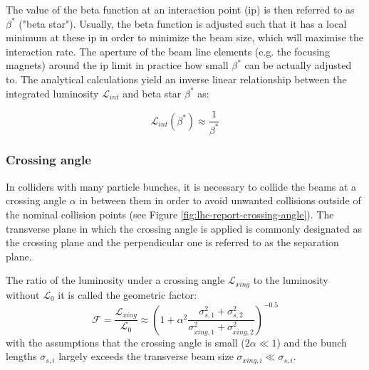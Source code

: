 \documentclass[encoding=utf8,british]{tumphthesis}
\begin{document}
The value of the beta function at an interaction point (\acrshort{ip}) is then referred to as $\beta^*$ ("beta star"). Usually, the beta function is adjusted such that it has a local minimum at these \acrshort{ip} in order to minimize the beam size, which will maximise the interaction rate. The aperture of the beam line elements (e.g. the focusing magnets) around the \acrshort{ip} limit in practice how small $\beta^*$ can be actually adjusted to. The analytical calculations \cite{Hostettler:2319396} yield an inverse linear relationship between the integrated luminosity $\mathcal{L}_{int}$ and beta star $\beta^*$ as:

\begin{equation}
    \mathcal{L}_{int}(\beta^*) \approx \frac{1}{\beta^{*}}
\end{equation}

\subsubsection{Crossing angle}
In colliders with many particle bunches, it is necessary to collide the beams at a crossing angle $\alpha$ in between them in order to avoid unwanted collisions outside of the nominal collision points (see Figure \ref{fig:lhc-report-crossing-angle}). The transverse plane in which the crossing angle is applied is commonly designated as the crossing plane and the perpendicular one is referred to as the separation plane.



The ratio of the luminosity under a crossing angle $\mathcal{L}_{xing}$ to the luminosity without $\mathcal{L}_0$ it is called the geometric factor:
\begin{equation}
    \mathcal{F} = \frac{\mathcal{L}_{xing}}{\mathcal{L}_0} \approx \left( 1 + \alpha^2 \frac{\sigma^2_{s,1} + \sigma^2_{s,2}}{\sigma^2_{xing,1} + \sigma^2_{xing,2}} \right)^{-0.5}
    \label{eq:geometric-factor-crossingangle}
\end{equation}
with the assumptions that the crossing angle is small ($2\alpha \ll 1$) and the bunch lengths $\sigma_{s,i}$ largely exceeds the transverse beam size $\sigma_{xing,i} \ll \sigma_{s,i}$.
\end{document}
